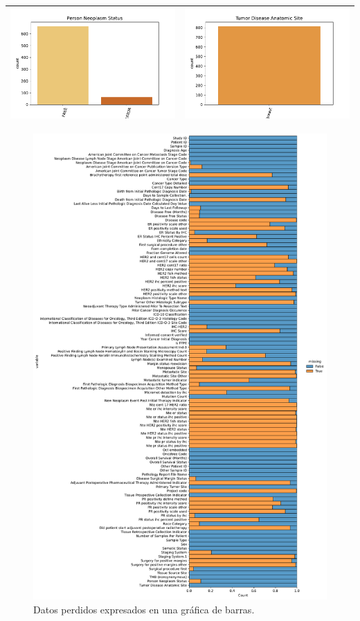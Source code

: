 \begin{center}
\begin{tabular}{ |c|c|c|c| }
		\\  \hline                
	\end{tabular} 
	\begin{tabular}{ |c|c| }  
		\hline 
		\includegraphics[width=.22\textwidth]{NOTEBOOK/IMAGENES_CRUDAS/109} 
		& \includegraphics[width=.25\textwidth]{NOTEBOOK/IMAGENES_CRUDAS/110}
		\\  \hline 
	\end{tabular} 
\end{center} 

\newpage
\begin{figure}[!htb]
	\centering
	\includegraphics[width=1
	\linewidth]{NOTEBOOK/IMAGENES_PERDIDAS/missing_displot}
	\caption{Datos perdidos expresados en una gráfica de barras.}
	\label{Missing_Bar_Chart}
\end{figure}

